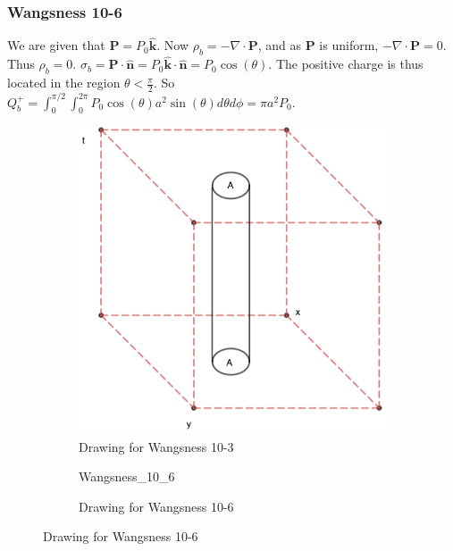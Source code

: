 \documentclass[crop=false,class=article,oneside]{standalone}
\begin{document}
        \subsubsection{Wangsness 10-6}
        We are given that $\mathbf{P} = P_0 \hat{\mathbf{k}}$. Now $\rho_{b} = -\nabla \cdot \mathbf{P}$, and as $\mathbf{P}$ is uniform, $-\nabla \cdot \mathbf{P} = 0$. Thus $\rho_b = 0$. $\sigma_b = \mathbf{P}\cdot \hat{\mathbf{n}} = P_0 \hat{\mathbf{k}} \cdot \hat{\mathbf{n}} = P_0 \cos(\theta)$. The positive charge is thus located in the region $\theta < \frac{\pi}{2}$. So $Q_b^+ = \int_{0}^{\pi/2}\int_{0}^{2\pi} P_0 \cos(\theta) a^2 \sin(\theta) d\theta d\phi = \pi a^2 P_0$.
        \begin{figure}[htbp]
            \centering
            \begin{subfigure}[b]{0.49\textwidth}
                \centering
                \captionsetup{type=figure}
                \includegraphics[scale=0.4]{10-3.png}
                \caption{Drawing for Wangsness 10-3}
            \end{subfigure}
            \begin{subfigure}[b]{0.49\textwidth}
                \centering
                \captionsetup{type=figure}
                {Wangsness_10_6}
                \caption{Drawing for Wangsness 10-6}
            \end{subfigure}
        \end{figure}
\end{document}
